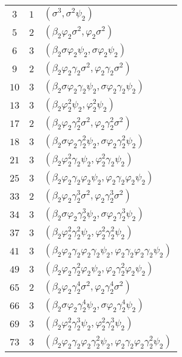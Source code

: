 \tablelasttail{\hline}
\begin{supertabular}{|c|c|p{9cm}|}
$3$
&$1$ &$(\sigma^{3},\sigma^{2}\psi_2)$\\
$5$
&$2$ &$(\beta_2\varphi_2\sigma^{2},\varphi_2\sigma^{2})$\\
$6$
&$3$ &$(\beta_2\sigma\varphi_2\psi_2,\sigma\varphi_2\psi_2)$\\
$9$
&$2$ &$(\beta_2\varphi_2\gamma_2\sigma^{2},\varphi_2\gamma_2\sigma^{2})$\\
$10$
&$3$ &$(\beta_2\sigma\varphi_2\gamma_2\psi_2,\sigma\varphi_2\gamma_2\psi_2)$\\
$13$
&$3$ &$(\beta_2\varphi_2^{2}\psi_2,\varphi_2^{2}\psi_2)$\\
$17$
&$2$ &$(\beta_2\varphi_2\gamma_2^{2}\sigma^{2},\varphi_2\gamma_2^{2}\sigma^{2})$\\
$18$
&$3$ &$(\beta_2\sigma\varphi_2\gamma_2^{2}\psi_2,\sigma\varphi_2\gamma_2^{2}\psi_2)$\\
$21$
&$3$ &$(\beta_2\varphi_2^{2}\gamma_2\psi_2,\varphi_2^{2}\gamma_2\psi_2)$\\
$25$
&$3$ &$(\beta_2\varphi_2\gamma_2\varphi_2\psi_2,\varphi_2\gamma_2\varphi_2\psi_2)$\\
$33$
&$2$ &$(\beta_2\varphi_2\gamma_2^{3}\sigma^{2},\varphi_2\gamma_2^{3}\sigma^{2})$\\
$34$
&$3$ &$(\beta_2\sigma\varphi_2\gamma_2^{3}\psi_2,\sigma\varphi_2\gamma_2^{3}\psi_2)$\\
$37$
&$3$ &$(\beta_2\varphi_2^{2}\gamma_2^{2}\psi_2,\varphi_2^{2}\gamma_2^{2}\psi_2)$\\
$41$
&$3$ &$(\beta_2\varphi_2\gamma_2\varphi_2\gamma_2\psi_2,\varphi_2\gamma_2\varphi_2\gamma_2\psi_2)$\\
$49$
&$3$ &$(\beta_2\varphi_2\gamma_2^{2}\varphi_2\psi_2,\varphi_2\gamma_2^{2}\varphi_2\psi_2)$\\
$65$
&$2$ &$(\beta_2\varphi_2\gamma_2^{4}\sigma^{2},\varphi_2\gamma_2^{4}\sigma^{2})$\\
$66$
&$3$ &$(\beta_2\sigma\varphi_2\gamma_2^{4}\psi_2,\sigma\varphi_2\gamma_2^{4}\psi_2)$\\
$69$
&$3$ &$(\beta_2\varphi_2^{2}\gamma_2^{3}\psi_2,\varphi_2^{2}\gamma_2^{3}\psi_2)$\\
$73$
&$3$ &$(\beta_2\varphi_2\gamma_2\varphi_2\gamma_2^{2}\psi_2,\varphi_2\gamma_2\varphi_2\gamma_2^{2}\psi_2)$\\

\end{supertabular}
